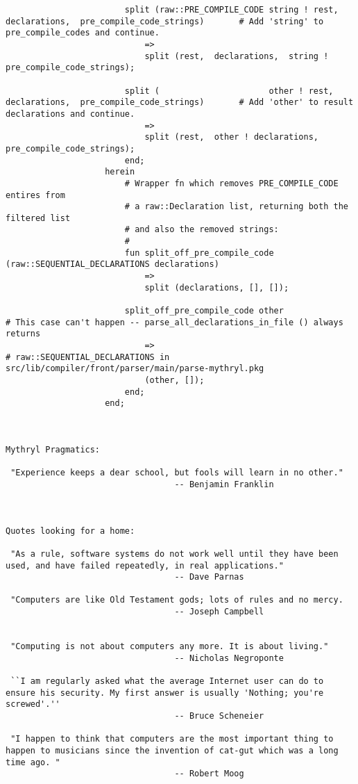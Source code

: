 \begin{verbatim}
						split (raw::PRE_COMPILE_CODE string ! rest,  declarations,  pre_compile_code_strings)		# Add 'string' to pre_compile_codes and continue.
						    =>
						    split (rest,  declarations,  string ! pre_compile_code_strings);
						    	
						split (                      other ! rest,   declarations,  pre_compile_code_strings)		# Add 'other' to result declarations and continue.
						    =>
						    split (rest,  other ! declarations,  pre_compile_code_strings);
					    end;
					herein
					    # Wrapper fn which removes PRE_COMPILE_CODE entires from
					    # a raw::Declaration list, returning both the filtered list
					    # and also the removed strings:
					    #
					    fun split_off_pre_compile_code (raw::SEQUENTIAL_DECLARATIONS declarations)
						    =>
						    split (declarations, [], []);

						split_off_pre_compile_code other								# This case can't happen -- parse_all_declarations_in_file () always returns
						    =>												# raw::SEQUENTIAL_DECLARATIONS in   src/lib/compiler/front/parser/main/parse-mythryl.pkg 
						    (other, []);
					    end;
					end;



Mythryl Pragmatics:

 "Experience keeps a dear school, but fools will learn in no other."
                                  -- Benjamin Franklin



Quotes looking for a home:

 "As a rule, software systems do not work well until they have been used, and have failed repeatedly, in real applications."
                                  -- Dave Parnas 

 "Computers are like Old Testament gods; lots of rules and no mercy. 
                                  -- Joseph Campbell 


 "Computing is not about computers any more. It is about living."
                                  -- Nicholas Negroponte 

 ``I am regularly asked what the average Internet user can do to ensure his security. My first answer is usually 'Nothing; you're screwed'.'' 
                                  -- Bruce Scheneier 

 "I happen to think that computers are the most important thing to happen to musicians since the invention of cat-gut which was a long time ago. "
                                  -- Robert Moog 


\end{verbatim}
